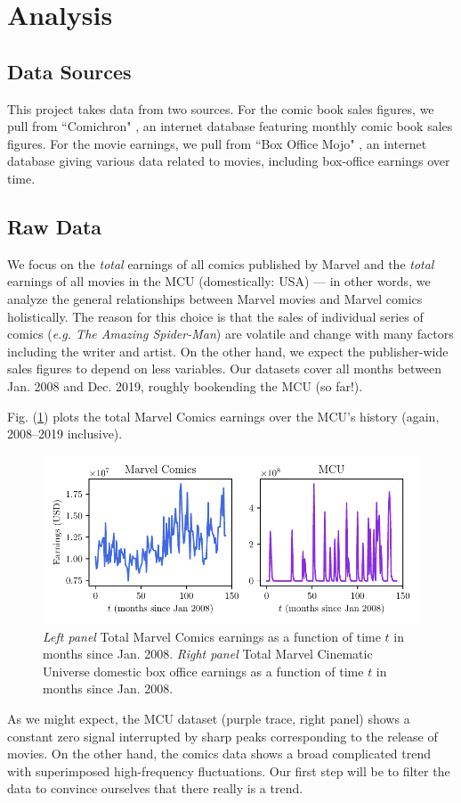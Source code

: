\documentclass[12pt]{article}
\begin{document}
\section{Analysis}
\subsection{Data Sources}
This project takes data from two sources.  For the comic book sales figures, we pull from ``Comichron" \cite{comichron}, an internet database featuring monthly comic book sales figures.  For the movie earnings, we pull from ``Box Office Mojo" \cite{boxofficemojo}, an internet database giving various data related to movies, including box-office earnings over time.


\subsection{Raw Data}
We focus on the \textit{total} earnings of all comics published by Marvel and the \textit{total} earnings of all movies in the MCU (domestically: USA) ---  in other words, we analyze the general relationships between Marvel movies and Marvel comics holistically.  The reason for this choice is that the sales of individual series of comics (\textit{e.g. The Amazing Spider-Man}) are volatile and change with many factors including the writer and artist. On the other hand, we expect the publisher-wide sales figures to depend on less variables.  Our datasets cover all months between Jan. 2008 and Dec. 2019, roughly bookending the MCU (so far!).

Fig. (\ref{fig:raw_data1}) plots the total Marvel Comics earnings over the MCU's history (again, 2008--2019 inclusive).
\begin{figure}[h]
    \centering
    \includegraphics{figures/raw_data1.pdf}
    \caption{\textit{Left panel} Total Marvel Comics earnings as a function of time $t$ in months since Jan. 2008.  \textit{Right panel} Total Marvel Cinematic Universe domestic box office earnings as a function of time $t$ in months since Jan. 2008.}\label{fig:raw_data1}
\end{figure}
As we might expect, the MCU dataset (purple trace, right panel) shows a constant zero signal interrupted by sharp peaks corresponding to the release of movies.  On the other hand, the comics data shows a broad complicated trend with superimposed high-frequency fluctuations.  Our first step will be to filter the data to convince ourselves that there really is a trend.
\end{document}

